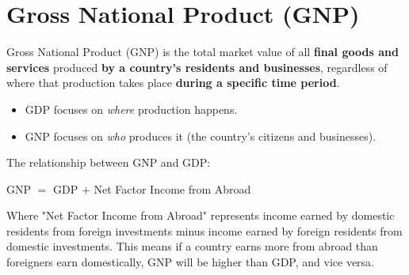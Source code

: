 \documentclass[a4paper, 11pt]{article}
\begin{document}
\section{Gross National Product (GNP)}
Gross National Product (GNP) is the total market value of all \textbf{final goods and services} produced \textbf{by a country's residents and businesses}, regardless of where that production takes place \textbf{during a specific time period}.
\begin{itemize}
    \item GDP focuses on \textit{where} production happens.
    \item GNP focuses on \textit{who} produces it (the country’s citizens and businesses).
\end{itemize}\vspace{10pt}
The relationship between GNP and GDP:
\begin{center}
GNP $=$ GDP $+$ Net Factor Income from Abroad    
\end{center}
Where "Net Factor Income from Abroad" represents income earned by domestic residents from foreign investments minus income earned by foreign residents from domestic investments. This means if a country earns more from abroad than foreigners earn domestically, GNP will be higher than GDP, and vice versa.
\end{document}
